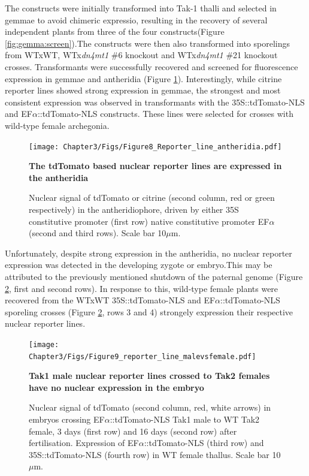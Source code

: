 The constructs were initially transformed into Tak-1 thalli and selected in gemmae to avoid chimeric expressio, resulting in the recovery of several independent plants from three of the four constructs(Figure \ref{fig:gemma:screen}).The constructs were then also transformed into sporelings from WTxWT, WTx\textit{dn4mt1} \#6 knockout and WTx\textit{dn4mt1} \#21 knockout crosses. Transformants were successfully recovered and screened for fluorescence expression in gemmae and antheridia (Figure \ref{fig:antheridia_screen}). Interestingly, while citrine reporter lines showed strong expression in gemmae, the strongest and most consistent expression was observed in transformants with the 35S::tdTomato-NLS and EF$\alpha$::tdTomato-NLS constructs. These lines were selected for crosses with wild-type female archegonia.

\begin{figure}[htbp!] 
\centering    
    \texttt{[image: Chapter3/Figs/Figure8\_Reporter\_line\_antheridia.pdf]}
\caption{\textbf{The tdTomato based nuclear reporter lines are expressed in the antheridia}}
\label{fig:antheridia_screen}
\captionsetup{font=small}
    \caption*{Nuclear signal of tdTomato or citrine (second column, red or green respectively) in the antheridiophore, driven by either 35S constitutive promoter (first row) native constitutive promoter EF$\alpha$ (second and third rows). Scale bar 10$\mu$m.}
\end{figure}

Unfortunately, despite strong expression in the antheridia, no nuclear reporter expression was detected in the developing zygote or embryo.This may be attributed to the previously mentioned shutdown of the paternal genome (Figure \ref{fig:malevsfemale}, first and second rows).  In response to this, wild-type female plants were recovered from the WTxWT 35S::tdTomato-NLS and  EF$\alpha$::tdTomato-NLS sporeling crosses (Figure \ref{fig:malevsfemale}, rows 3 and 4) strongely expression their respective nuclear reporter lines.

\begin{figure}[htbp!] 
\centering    
    \texttt{[image: Chapter3/Figs/Figure9\_reporter\_line\_malevsfemale.pdf]}
\caption{\textbf{Tak1 male nuclear reporter lines crossed to Tak2 females have no nuclear expression in the embryo}}
\label{fig:malevsfemale}
\captionsetup{font=small}
    \caption*{Nuclear signal of tdTomato (second column, red, white arrows) in embryos crossing EF$\alpha$::tdTomato-NLS Tak1 male to WT Tak2 female, 3 days (first row) and 16 days (second row) after fertilisation. Expression of EF$\alpha$::tdTomato-NLS (third row) and  35S::tdTomato-NLS (fourth row) in WT female thallus. Scale bar 10$\mu$m.}
\end{figure}


